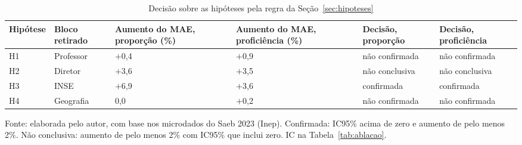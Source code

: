 \begin{table}[H]
    \centering
    \footnotesize
    \caption{Decisão sobre as hipóteses pela regra da Seção~\ref{sec:hipoteses}}
    \begin{tabular}{C{0.8cm}L{2.0cm}C{2.0cm}C{2.0cm}C{2.6cm}C{2.6cm}}
        \toprule
        \textbf{Hipótese} & \textbf{Bloco retirado} & \textbf{Aumento do MAE, proporção (\%)} & \textbf{Aumento do MAE, proficiência (\%)} & \textbf{Decisão, proporção} & \textbf{Decisão, proficiência} \\
        \midrule
        H1 & Professor & $+$0,4 & $+$0,9 & não confirmada & não confirmada \\
        H2 & Diretor & $+$3,6 & $+$3,5 & não conclusiva & não conclusiva \\
        H3 & INSE & $+$6,9 & $+$3,6 & confirmada & confirmada \\
        H4 & Geografia & 0,0 & $+$0,2 & não confirmada & não confirmada \\
        \bottomrule
    \end{tabular}
    \vspace{0.1cm}
    \begin{flushleft}
    {\footnotesize Fonte: elaborada pelo autor, com base nos microdados do Saeb 2023 (Inep). Confirmada: IC95\% acima de zero e aumento de pelo menos 2\%. Não conclusiva: aumento de pelo menos 2\% com IC95\% que inclui zero. IC na Tabela~\ref{tab:ablacao}.}
    \end{flushleft}
    \label{tab:hipoteses}
\end{table}
